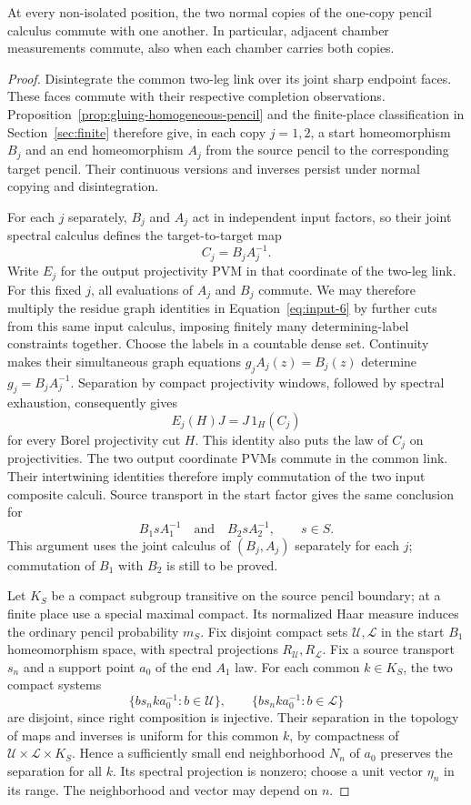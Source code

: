 \begin{lemma}
\label{lem:gluing-two-copy}
At every non-isolated position, the two normal copies of the
one-copy pencil calculus commute with one another.  In
particular, adjacent chamber measurements commute, also when
each chamber carries both copies.
\end{lemma}

\begin{proof}
Disintegrate the common two-leg link over its joint sharp endpoint
faces. These faces commute with their respective completion observations.
Proposition~\ref{prop:gluing-homogeneous-pencil} and the finite-place
classification in Section~\ref{sec:finite} therefore give, in each copy
$j=1,2$, a start homeomorphism $B_j$ and an end homeomorphism $A_j$
from the source pencil to the corresponding target pencil. Their
continuous versions and inverses persist under normal copying and
disintegration.

For each $j$ separately, $B_j$ and $A_j$ act in independent input
factors, so their joint spectral calculus defines the target-to-target
map
\[
 C_j=B_jA_j^{-1}.
\]
Write $E_j$ for the output projectivity PVM in that coordinate of the
two-leg link. For this fixed $j$, all evaluations of $A_j$ and $B_j$
commute.
We may therefore multiply the residue graph identities in
Equation~\eqref{eq:input-6} by further cuts from this same input
calculus, imposing finitely many determining-label constraints together.
Choose the labels in a countable dense set. Continuity makes their
simultaneous graph equations $g_jA_j(z)=B_j(z)$ determine
$g_j=B_jA_j^{-1}$. Separation by compact projectivity windows, followed
by spectral exhaustion, consequently gives
\[
 E_j(H)J=J\,1_H(C_j)
\]
for every Borel projectivity cut $H$. This identity also puts the law
of $C_j$ on projectivities. The two output coordinate PVMs commute in
the common link. Their intertwining identities therefore imply
commutation of the two input composite calculi. Source transport in
the start factor gives the same conclusion for
\[
 B_1sA_1^{-1}\quad\text{and}\quad B_2sA_2^{-1},
 \qquad s\in S.
\]
This argument uses the joint calculus of $(B_j,A_j)$ separately for
each $j$; commutation of $B_1$ with $B_2$ is still to be proved.

Let $K_S$ be a compact subgroup transitive on the source
pencil boundary; at a finite place use a special maximal
compact.  Its normalized Haar measure induces the ordinary
pencil probability $m_S$.  Fix disjoint compact sets
$\mathcal U,\mathcal L$ in the start $B_1$ homeomorphism
space, with spectral projections $R_{\mathcal U},R_{\mathcal L}$.
Fix a source transport $s_n$ and a support point $a_0$ of
the end $A_1$ law.  For each common $k\in K_S$, the two
compact systems
\[
 \{b s_nk a_0^{-1}:b\in\mathcal U\},\qquad
 \{b s_nk a_0^{-1}:b\in\mathcal L\}
\]
are disjoint, since right composition is injective.
Their separation in the topology of maps and inverses is
uniform for this common $k$, by compactness of
$\mathcal U\times\mathcal L\times K_S$.
Hence a sufficiently small end neighborhood $N_n$ of $a_0$
preserves the separation for all $k$.  Its spectral
projection is nonzero; choose a unit vector $\eta_n$ in its
range.  The neighborhood and vector may depend on $n$.


\end{proof}
